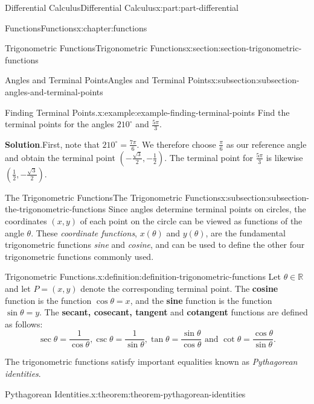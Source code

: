 \documentclass[twoside,10pt,]{book}
\newcommand{\blocktitlefont}{\relax}
\newcommand{\terminology}[1]{\textbf{#1}}
\numberwithin{equation}{part}
\newcommand{\RR}{\mathbb{R}}
\begin{document}
\begin{partptx}{Differential Calculus}{}{Differential Calculus}{}{}{x:part:part-differential}
\begin{chapterptx}{Functions}{}{Functions}{}{}{x:chapter:functions}
\begin{sectionptx}{Trigonometric Functions}{}{Trigonometric Functions}{}{}{x:section:section-trigonometric-functions}
\begin{subsectionptx}{Angles and Terminal Points}{}{Angles and Terminal Points}{}{}{x:subsection:subsection-angles-and-terminal-points}
\begin{example}{Finding Terminal Points.}{x:example:example-finding-terminal-points}%
Find the terminal points for the angles \(210^{\circ}\) and \(\frac{5\pi}{3}\).%
\par\smallskip%
\noindent\textbf{\blocktitlefont Solution}.\hypertarget{g:solution:idm35150999023808}{}\quad{}First, note that \(210^{\circ} = \frac{7\pi}{6}\). We therefore choose \(\frac{\pi}{6}\) as our reference angle and obtain the terminal point \((-\frac{\sqrt{3}}{2}, -\frac{1}{2})\). The terminal point for \(\frac{5\pi}{3}\) is likewise \((\frac{1}{2}, -\frac{\sqrt{3}}{2})\).%
\end{example}
\end{subsectionptx}
%
%
\typeout{************************************************}
\typeout{************************************************}
%
\begin{subsectionptx}{The Trigonometric Functions}{}{The Trigonometric Functions}{}{}{x:subsection:subsection-the-trigonometric-functions}
Since angles determine terminal points on circles, the coordinates \((x, y)\) of each point on the circle can be viewed as functions of the angle \(\theta\). These \emph{coordinate functions}, \(x(\theta)\) and \(y(\theta)\), are the fundamental trigonometric functions \emph{sine} and \emph{cosine}, and can be used to define the other four trigonometric functions commonly used.%
\begin{definition}{Trigonometric Functions.}{x:definition:definition-trigonometric-functions}%
%
Let \(\theta\in\RR\) and let \(P = (x,y)\) denote the corresponding terminal point. The \terminology{cosine} function is the function \(\cos\theta = x\), and the \terminology{sine} function is the function \(\sin\theta = y\). The \terminology{secant, cosecant, tangent} and \terminology{cotangent} functions are defined as follows:%
\begin{equation*}
\sec\theta = \frac{1}{\cos\theta}, \csc\theta = \frac{1}{\sin\theta}, \tan\theta = \frac{\sin\theta}{\cos\theta}\text{ and }\cot\theta = \frac{\cos\theta}{\sin\theta}\text{.}
\end{equation*}
%
\end{definition}
The trigonometric functions satisfy important equalities known as \emph{Pythagorean identities}.%
\begin{theorem}{Pythagorean Identities.}{}{x:theorem:theorem-pythagorean-identities}%
%

\end{theorem}
\end{subsectionptx}
\end{sectionptx}
\end{chapterptx}
\end{partptx}
\end{document}
